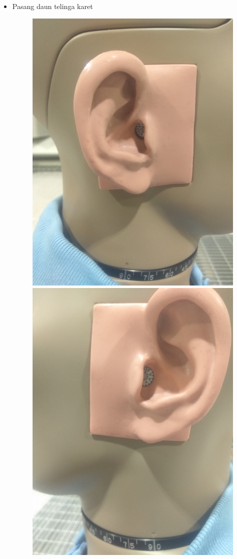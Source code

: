 \documentclass[12pt,]{article}
\begin{document}
\begin{itemize}
		\newpage
		\item Pasang daun telinga karet
		\begin{figure}[H]
			\centering
			\includegraphics[width=0.3\linewidth]{day_1/earleaf1}
			\includegraphics[width=0.3\linewidth]{day_1/earleaf2}
		\end{figure}
	

\end{itemize}
\end{document}
